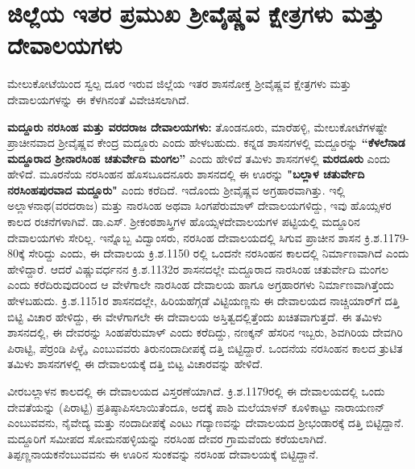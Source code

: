 \section*{ಜಿಲ್ಲೆಯ ಇತರ ಪ್ರಮುಖ ಶ‍್ರೀವೈಷ್ಣವ ಕ್ಷೇತ್ರಗಳು ಮತ್ತು ದೇವಾಲಯಗಳು}

ಮೇಲುಕೋಟೆಯಿಂದ ಸ್ವಲ್ಪ ದೂರ ಇರುವ ಜಿಲ್ಲೆಯ ಇತರ ಶಾಸನೋಕ್ತ ಶ‍್ರೀವೈಷ್ಣವ ಕ್ಷೇತ್ರಗಳು ಮತ್ತು ದೇವಾಲಯಗಳನ್ನು ಈ ಕೆಳಗಿನಂತೆ ವಿವೇಚಿಸಲಾಗಿದೆ.

\textbf{ಮದ್ದೂರು ನರಸಿಂಹ ಮತ್ತು ವರದರಾಜ ದೇವಾಲಯಗಳು:} ತೊಂಡನೂರು, ಮಾರೆಹಳ್ಳಿ, ಮೇಲುಕೋಟೆಗಳಷ್ಟೇ ಪ್ರಾಚೀನವಾದ ಶ‍್ರೀವೈಷ್ಣವ ಕೇಂದ್ರ ಮದ್ದೂರು ಎಂದು ಹೇಳಬಹುದು. ಕನ್ನಡ ಶಾಸನಗಳಲ್ಲಿ ಮದ್ದೂರನ್ನು \textbf{“ಕೆಳಲೆನಾಡ ಮದ್ದೂರಾದ ಶ‍್ರೀನಾರಸಿಂಹ ಚತುರ್ವೇದಿ ಮಂಗಲ”} ಎಂದು ಹೇಳಿದೆ ತಮಿಳು ಶಾಸನಗಳಲ್ಲಿ \textbf{ಮರದೂರು} ಎಂದು ಹೇಳಿದೆ. ಮೂರನೆಯ ನರಸಿಂಹನ ಹೊಸಬೂದನೂರು ಶಾಸನದಲ್ಲಿ ಈ ಊರನ್ನು \textbf{"ಬಲ್ಲಾಳ ಚತುರ್ವೇದಿ ನರಸಿಂಹಪುರವಾದ ಮದ್ದೂರು"} ಎಂದು ಕರೆದಿದೆ. ಇದೊಂದು ಶ‍್ರೀವೈಷ್ಣವ ಅಗ್ರಹಾರವಾಗಿತ್ತು. ಇಲ್ಲಿ ಅಲ್ಲಾಳನಾಥ(ವರದರಾಜ) ಮತ್ತು ನಾರಸಿಂಹ ಅಥವಾ ಸಿಂಗಪೆರುಮಾಳ್​ ದೇವಾಲಯಗಳಿದ್ದು, ಇವು ಹೊಯ್ಸಳರ ಕಾಲದ ರಚನೆಗಳಾಗಿವೆ. ಡಾ.ಎಸ್​. ಶ‍್ರೀಕಂಠಶಾಸ್ತ್ರಿಗಳ ಹೊಯ್ಸಳದೇವಾಲಯಗಳ ಪಟ್ಟಿಯಲ್ಲಿ ಮದ್ದೂರಿನ ದೇವಾಲಯಗಳು ಸೇರಿಲ್ಲ. ಇನ್ನೊಬ್ಬ ವಿದ್ವಾಂಸರು, ನರಸಿಂಹ ದೇವಾಲಯದಲ್ಲಿ ಸಿಗುವ ಪ್ರಾಚೀನ ಶಾಸನ ಕ್ರಿ.ಶ.1179-80ಕ್ಕೆ ಸೇರಿದ್ದು ಎಂದು, ಈ ದೇವಾಲಯ ಕ್ರಿ.ಶ.1150 ರಲ್ಲಿ ಒಂದನೇ ನರಸಿಂಹನ ಕಾಲದಲ್ಲಿ ನಿರ್ಮಾಣವಾಗಿದೆ ಎಂದು ಹೇಳಿದ್ದಾರೆ. ಆದರೆ ವಿಷ್ಣುವರ್ಧನನ ಕ್ರಿ.ಶ.1132ರ ಶಾಸನದಲ್ಲೇ ಮದ್ದೂರಾದ ನಾರಸಿಂಹ ಚತುರ್ವೇದಿ ಮಂಗಲ ಎಂದು ಕರೆದಿರುವುದರಿಂದ ಆ ವೇಳೆಗಾಲೇ ನಾರಸಿಂಹ ದೇವಾಲಯ ಹಾಗೂ ಅಗ್ರಹಾರಗಳು ನಿರ್ಮಾಣವಾಗಿತ್ತೆಂದು ಹೇಳಬಹುದು. ಕ್ರಿ.ಶ.1151ರ ಶಾಸನದಲ್ಲೇ, ಹಿರಿಯಹೆಗ್ಗಡೆ ವಿಟ್ಟಿಯಣ್ಣನು ಈ ದೇವಾಲಯದ ನಾಚ್ಚಿಯಾರ್​ಗೆ ದತ್ತಿ ಬಿಟ್ಟಿ ವಿಚಾರ ಹೇಳಿದ್ದು, ಈ ವೇಳೆಗಾಗಲೇ ಈ ದೇವಾಲಯ ಅಸ್ತಿತ್ವದಲ್ಲಿತ್ತೆಂದು ಖಚಿತವಾಗುತ್ತದೆ. ಈ ತಮಿಳು ಶಾಸನದಲ್ಲಿ, ಈ ದೇವರನ್ನು ಸಿಂಹಪೆರುಮಾಳ್​ ಎಂದು ಕರೆದಿದ್ದು, ನಣಕ್ಕನ್​ ಹೆಸರಿನ ಇಬ್ಬರು, ಶಿವಗಿರಿಯ ದೇವಗಿರಿ ಪಿರಾಟ್ಟಿ, ಪೆರ್ರಂಡಿ ಪಿಳ್ಳೈ, ಎಂಬುವವರು ತಿರುನಂದಾದೀಪಕ್ಕೆ ದತ್ತಿ ಬಿಟ್ಟಿದ್ದಾರೆ. ಒಂದನೆಯ ನರಸಿಂಹನ ಕಾಲದ ತ್ರುಟಿತ ತಮಿಳು ಶಾಸನಗಳಲ್ಲಿ ಈ ದೇವಾಲಯಕ್ಕೆ ದತ್ತಿ ಬಿಟ್ಟ ವಿಚಾರವನ್ನು ಹೇಳಿದೆ.

ವೀರಬಲ್ಲಾಳನ ಕಾಲದಲ್ಲಿ ಈ ದೇವಾಲಯದ ವಿಸ್ತರಣೆಯಾಗಿದೆ. ಕ್ರಿ.ಶ.1179ರಲ್ಲಿ ಈ ದೇವಾಲಯದಲ್ಲಿ ಒಂದು ದೇವತೆಯನ್ನು (ಪಿರಾಟ್ಟಿ) ಪ್ರತಿಷ್ಠಾಪಿಸಲಾಯಿತೆಂದೂ, ಅದಕ್ಕೆ ಪಾಶಿ ಮಲೆಯಾಳನ್​ ಕೂಳಿಕಾಟ್ಟು ನಾರಾಯಣನ್​ ಎಂಬುವವನು, ನೈವೇದ್ಯ ಮತ್ತು ನಂದಾದೀಪಕ್ಕೆ ಎಂಟು ಗದ್ಯಾಣವನ್ನು ದೇವಾಲಯದ ಶ‍್ರೀಭಂಡಾರಕ್ಕೆ ದತ್ತಿ ಬಿಟ್ಟಿದ್ದಾನೆ. ಮದ್ದೂರಿಗೆ ಸಮೀಪದ ಸೋಮನಹಳ್ಳಿಯನ್ನು ನರಸಿಂಹ ದೇವರ ಗ್ರಾಮವೆಂದು ಕರೆಯಲಾಗಿದೆ. ತಿಪ್ಪಣ್ಣನಾಯಕನೆಂಬುವವನು ಈ ಊರಿನ ಸುಂಕವನ್ನು ನರಸಿಂಹ ದೇವಾಲಯಕ್ಕೆ ಬಿಟ್ಟಿದ್ದಾನೆ.

